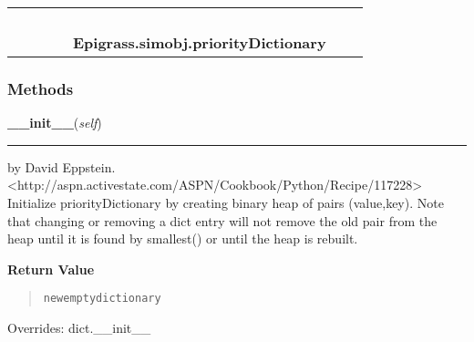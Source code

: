     \label{Epigrass:simobj:priorityDictionary}
\begin{tabular}{cccccccc}
\multicolumn{2}{r}{\settowidth{\BCL}{object}\multirow{2}{\BCL}{object}}
&&
&&
  \\\cline{3-3}
  &&\multicolumn{1}{c|}{}
&&
&&
  \\
\multicolumn{4}{r}{\settowidth{\BCL}{dict}\multirow{2}{\BCL}{dict}}
&&
  \\\cline{5-5}
  &&&&\multicolumn{1}{c|}{}
&&
  \\
&&&&\multicolumn{2}{l}{\textbf{Epigrass.simobj.priorityDictionary}}
\end{tabular}



  \subsubsection{Methods}

    \vspace{0.5ex}

    \begin{boxedminipage}{\textwidth}

    \raggedright \textbf{\_\_init\_\_}(\textit{self})

    \vspace{-1.5ex}

    \rule{\textwidth}{0.5\fboxrule}
    by David Eppstein. 
    {\textless}http://aspn.activestate.com/ASPN/Cookbook/Python/Recipe/117228{\textgreater}
    Initialize priorityDictionary by creating binary heap of pairs 
    (value,key).  Note that changing or removing a dict entry will not 
    remove the old pair from the heap until it is found by smallest() or 
    until the heap is rebuilt.

    \vspace{1ex}

      \textbf{Return Value}
      \begin{quote}
\begin{alltt}
new empty dictionary
\end{alltt}

      \end{quote}

    \vspace{1ex}

      Overrides: dict.\_\_init\_\_

    \end{boxedminipage}


